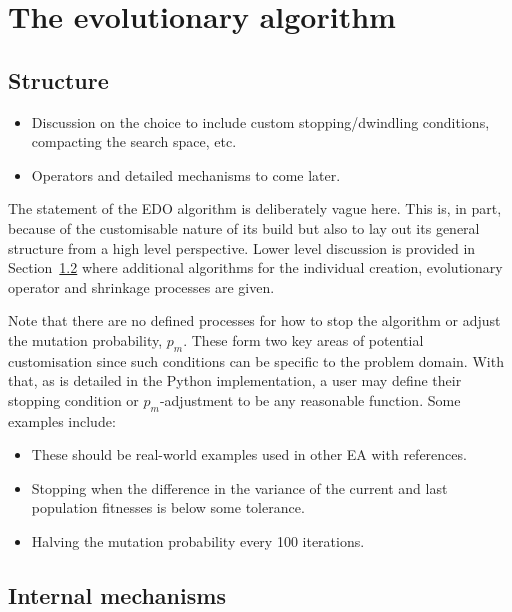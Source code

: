 \section{The evolutionary algorithm}\label{section:algorithm}

\subsection{Structure}

\begin{itemize}
    \item Discussion on the choice to include custom stopping/dwindling
        conditions, compacting the search space, etc.
    \item Operators and detailed mechanisms to come later.
\end{itemize}

\label{alg:edo}



The statement of the EDO algorithm is deliberately vague here. This is, in part,
because of the customisable nature of its build but also to lay out its general
structure from a high level perspective. Lower level discussion is provided in
Section~\ref{subsection:mechanisms} where additional algorithms for the
individual creation, evolutionary operator and shrinkage processes are given.

Note that there are no defined processes for how to stop the algorithm or adjust
the mutation probability, \(p_m\). These form two key areas of potential
customisation since such conditions can be specific to the problem domain. With
that, as is detailed in the Python implementation, a user may define their
stopping condition or \(p_m\)-adjustment to be any reasonable function. Some
examples include:

\begin{itemize}
    \item These should be real-world examples used in other EA with references.
    \item Stopping when the difference in the variance of the current and last
        population fitnesses is below some tolerance.
    \item Halving the mutation probability every 100 iterations.
\end{itemize}

\subsection{Internal mechanisms}\label{subsection:mechanisms}

